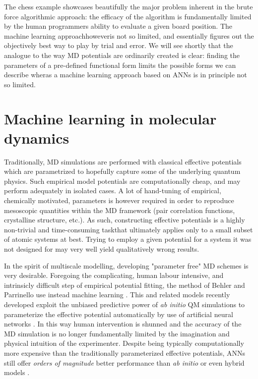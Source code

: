 \documentclass[twoside,english]{uiofysmaster}
\begin{document}
The chess example showcases beautifully the major problem inherent in the brute force algorithmic approach: the efficacy of the algorithm is fundamentally limited by the human programmers ability to evaluate a given board position. The machine learning approach\textemdash however\textemdash is not so limited, and essentially figures out the objectively best way to play by trial and error. We will see shortly that the analogue to the way MD potentials are ordinarily created is clear: finding the parameters of a pre-defined functional form limits the possible forms we can describe wheras a machine learning approach based on ANNs is in principle not so limited. 


\section{Machine learning in molecular dynamics}
Traditionally, MD simulations are performed with classical effective potentials which are parametrized to hopefully capture some of the underlying quantum physics. Such empirical model potentials are computationally cheap, and may perform adequately in isolated cases. A lot of hand-tuning of empirical, chemically motivated, parameters is however required in order to reproduce mesoscopic quantities within the MD framework (pair correlation functions, crystalline structure, etc.). As such, constructing effective potentials is a highly non-trivial and time-consuming task\textemdash that ultimately applies only to a small subset of atomic systems at best. Trying to employ a given potential for a 
system it was not designed for may very well yield qualitatively wrong results. 

In the spirit of multiscale modelling, developing "parameter free" MD schemes is very desirable. Foregoing the complicating, human labour intensive, and intrinsicly difficult step of empirical potential fitting, the method of Behler and Parrinello use instead machine learning \cite{behlerparrinello}. This and related models recently developed exploit the unbiased predictive power of \emph{ab initio} QM simulations to parameterize the effective potential automatically by use of artificial neural networks \cite{shen}. In this way human intervention is  shunned and the accuracy of the MD simulation is no longer fundamentally limited by the imagination and physical intuition of the experimenter. Despite being typically computationally more expensive than the traditionally parameterized effective potentials, ANNs still offer \emph{orders of magnitude} better performance than \emph{ab initio} or even hybrid models \cite{ratcliff,behler}.
\end{document}
